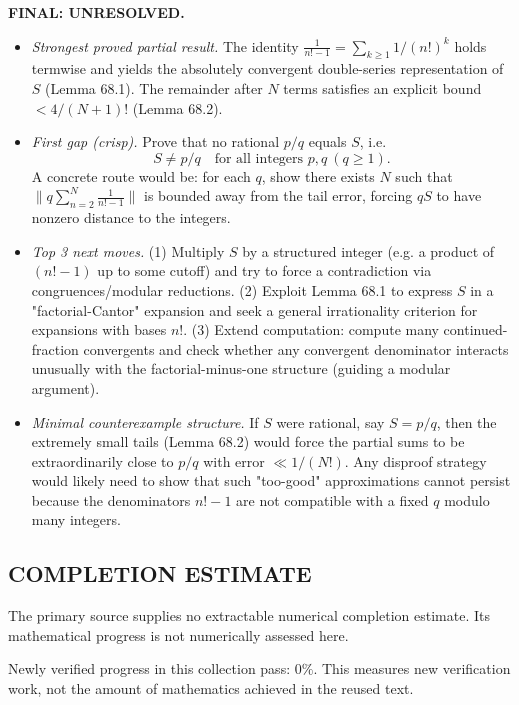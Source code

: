 \medskip
\noindent\textbf{FINAL: \textbf{UNRESOLVED}.}
\begin{itemize}
\item[(i)] \emph{Strongest proved partial result.} The identity $\frac{1}{n!-1}=\sum_{k\ge1}1/(n!)^k$ holds termwise and yields the absolutely convergent double-series representation of $S$ (Lemma 68.1). The remainder after $N$ terms satisfies an explicit bound $<4/(N+1)!$ (Lemma 68.2).
\item[(ii)] \emph{First gap (crisp).} Prove that no rational $p/q$ equals $S$, i.e.
\[S\neq p/q\quad\text{for all integers }p,q\ (q\ge1).\]
A concrete route would be: for each $q$, show there exists $N$ such that $\big\lVert q\sum_{n=2}^{N}\frac{1}{n!-1}\big\rVert$ is bounded away from the tail error, forcing $qS$ to have nonzero distance to the integers.
\item[(iii)] \emph{Top 3 next moves.}
(1) Multiply $S$ by a structured integer (e.g. a product of $(n!-1)$ up to some cutoff) and try to force a contradiction via congruences/modular reductions.
(2) Exploit Lemma 68.1 to express $S$ in a "factorial-Cantor" expansion and seek a general irrationality criterion for expansions with bases $n!$.
(3) Extend computation: compute many continued-fraction convergents and check whether any convergent denominator interacts unusually with the factorial-minus-one structure (guiding a modular argument).
\item[(iv)] \emph{Minimal counterexample structure.} If $S$ were rational, say $S=p/q$, then the extremely small tails (Lemma 68.2) would force the partial sums to be extraordinarily close to $p/q$ with error $\ll 1/(N!)$. Any disproof strategy would likely need to show that such "too-good" approximations cannot persist because the denominators $n!-1$ are not compatible with a fixed $q$ modulo many integers.
\end{itemize}




\subsection*{COMPLETION ESTIMATE}
The primary source supplies no extractable numerical completion estimate. Its mathematical progress is not numerically assessed here.

Newly verified progress in this collection pass: $0\%$. This measures new verification work, not the amount of mathematics achieved in the reused text.
